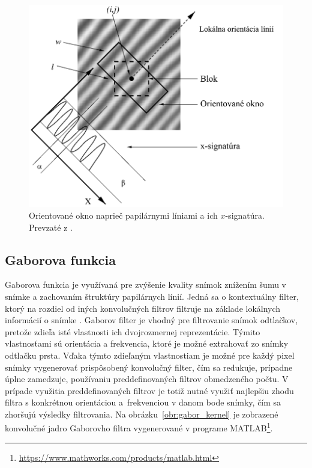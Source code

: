   \begin{figure}[h]
    \centering
    \includegraphics[width=0.7\linewidth]{obrazky-figures/frekvencia-Hong.png}
    \caption{Orientované okno naprieč papilárnymi líniami a ich $x$-signatúra. Prevzaté z \cite{Hong}.}
    \label{obr:frekvencia-Hong}
  \end{figure}

  \subsection{Gaborova funkcia} \label{sec:gaborova_funkcia}
  Gaborova funkcia je využívaná pre zvýšenie kvality snímok znížením šumu v snímke a zachovaním štruktúry papilárnych línií. Jedná sa o kontextuálny
  filter, ktorý na rozdiel od iných konvolučných filtrov filtruje na základe lokálnych informácií o snímke \cite{Handbook}. Gaborov filter je vhodný
  pre filtrovanie snímok odtlačkov, pretože zdieľa isté vlastnosti ich dvojrozmernej reprezentácie. Týmito vlastnosťami sú orientácia a frekvencia,
  ktoré je možné extrahovať zo snímky odtlačku prsta. Vďaka týmto zdieľaným vlastnostiam je možné pre každý pixel snímky vygenerovať prispôsobený konvolučný
  filter, čím sa redukuje, prípadne úplne zamedzuje, používaniu preddefinovaných filtrov obmedzeného počtu. V prípade využitia preddefinovaných filtrov je totiž
  nutné využiť najlepšiu zhodu filtra s konkrétnou orientáciou a~frekvenciou v danom bode snímky, čím sa zhoršujú výsledky filtrovania.
  Na obrázku~{\ref{obr:gabor_kernel}} je zobrazené konvolučné jadro Gaborovho filtra vygenerované v programe
  \mbox{MATLAB}\footnote{\url{https://www.mathworks.com/products/matlab.html}}.
  

